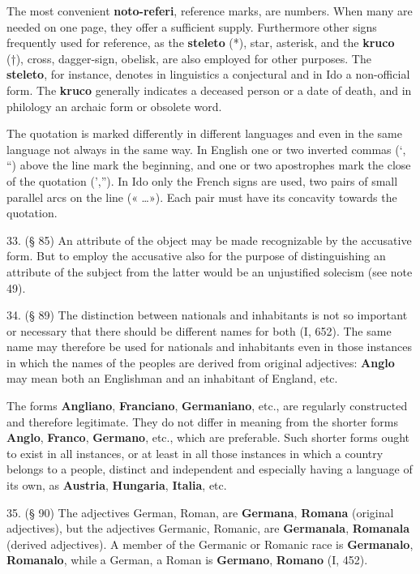 The most convenient \textbf{noto-referi}, reference marks, are numbers. When many are needed on one page, they offer a sufficient supply. Furthermore other signs frequently used for reference, as the \textbf{steleto} (*), star, asterisk, and the \textbf{kruco} (†), cross, dagger-sign, obelisk, are also employed for other purposes. The \textbf{steleto}, for instance, denotes in linguistics a conjectural and in Ido a non-official form. The \textbf{kruco} generally indicates a deceased person or a date of death, and in philology an archaic form or obsolete word.

The quotation is marked differently in different languages and even in the same language not always in the same way. In English one or two inverted commas (`, ``) above the line mark the beginning, and one or two apostrophes mark the close of the quotation (',''). In Ido only the French signs are used, two pairs of small parallel arcs on the line (« \ldots »). Each pair must have its concavity towards the quotation.

33. (§ 85) An attribute of the object may be made recognizable by the accusative form. But to employ the accusative also for the purpose of distinguishing an attribute of the subject from the latter would be an unjustified solecism (see note 49). %

34. (§ 89) The distinction between nationals and inhabitants is not so important or necessary that there should be different names for both (I, 652). The same name may therefore be used for nationals and inhabitants even in those instances in which the names of the peoples are derived from original adjectives: \textbf{Anglo} may mean both an Englishman and an inhabitant of England, etc. %

The forms \textbf{Angliano}, \textbf{Franciano}, \textbf{Germaniano}, etc., are regularly constructed and therefore legitimate. They do not differ in meaning from the shorter forms \textbf{Anglo}, \textbf{Franco}, \textbf{Germano}, etc., which are preferable. Such shorter forms ought to exist in all instances, or at least in all those instances in which a country belongs to a people, distinct and independent and especially having a language of its own, as \textbf{Austria}, \textbf{Hungaria}, \textbf{Italia}, etc.

35. (§ 90) The adjectives German, Roman, are \textbf{Germana}, \textbf{Romana} (original adjectives), but the adjectives Germanic, Romanic, are \textbf{Germanala}, \textbf{Romanala} (derived adjectives). A member of the Germanic or Romanic race is \textbf{Germanalo}, \textbf{Romanalo}, while a German, a Roman is \textbf{Germano}, \textbf{Romano} (I, 452). %

